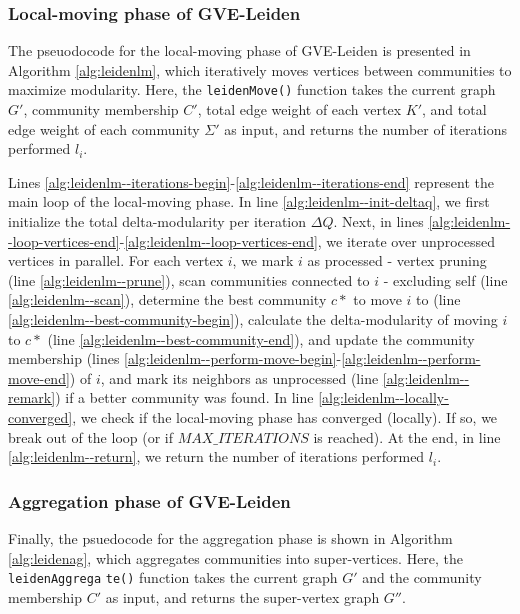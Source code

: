 \subsubsection{Local-moving phase of GVE-Leiden}

The pseuodocode for the local-moving phase of GVE-Leiden is presented in Algorithm \ref{alg:leidenlm}, which iteratively moves vertices between communities to maximize modularity. Here, the \texttt{leidenMove()} function takes the current graph $G'$, community membership $C'$, total edge weight of each vertex $K'$, and total edge weight of each community $\Sigma'$ as input, and returns the number of iterations performed $l_i$.

Lines \ref{alg:leidenlm--iterations-begin}-\ref{alg:leidenlm--iterations-end} represent the main loop of the local-moving phase. In line \ref{alg:leidenlm--init-deltaq}, we first initialize the total delta-modularity per iteration $\Delta Q$. Next, in lines \ref{alg:leidenlm--loop-vertices-end}-\ref{alg:leidenlm--loop-vertices-end}, we iterate over unprocessed vertices in parallel. For each vertex $i$, we mark $i$ as processed - vertex pruning (line \ref{alg:leidenlm--prune}), scan communities connected to $i$ - excluding self (line \ref{alg:leidenlm--scan}), determine the best community $c*$ to move $i$ to (line \ref{alg:leidenlm--best-community-begin}), calculate the delta-modularity of moving $i$ to $c*$ (line \ref{alg:leidenlm--best-community-end}), and update the community membership  (lines \ref{alg:leidenlm--perform-move-begin}-\ref{alg:leidenlm--perform-move-end}) of $i$, and mark its neighbors as unprocessed (line \ref{alg:leidenlm--remark}) if a better community was found. In line \ref{alg:leidenlm--locally-converged}, we check if the local-moving phase has converged (locally). If so, we break out of the loop (or if $MAX\_ITERATIONS$ is reached). At the end, in line \ref{alg:leidenlm--return}, we return the number of iterations performed $l_i$.


\subsubsection{Aggregation phase of GVE-Leiden}

Finally, the psuedocode for the aggregation phase is shown in Algorithm \ref{alg:leidenag}, which aggregates communities into super-vertices. Here, the \texttt{leidenAggrega} \texttt{te()} function takes the current graph $G'$ and the community membership $C'$ as input, and returns the super-vertex graph $G''$.

